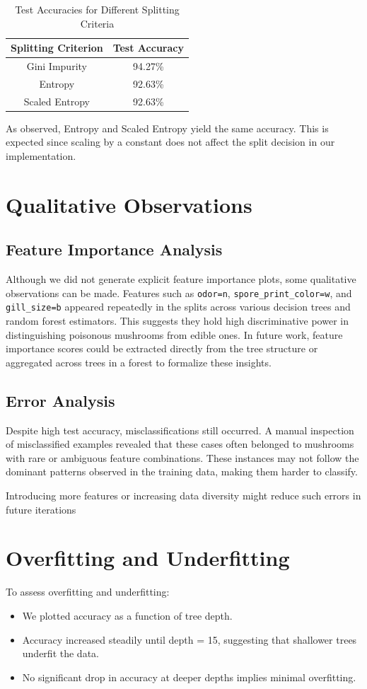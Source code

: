 \documentclass[11pt]{article}
\begin{document}
\begin{table}[H]
\centering
\begin{tabular}{|c|c|}
\hline
\textbf{Splitting Criterion} & \textbf{Test Accuracy} \\
\hline
Gini Impurity & 94.27\% \\
Entropy & 92.63\% \\
Scaled Entropy & 92.63\% \\
\hline
\end{tabular}
\caption{Test Accuracies for Different Splitting Criteria}
\end{table}

As observed, Entropy and Scaled Entropy yield the same accuracy. This is expected since scaling by a constant does not affect the split decision in our implementation.

\section{Qualitative Observations}
\subsection{Feature Importance Analysis}

Although we did not generate explicit feature importance plots, some qualitative observations can be made. Features such as \texttt{odor=n}, \texttt{spore\_print\_color=w}, and \texttt{gill\_size=b} appeared repeatedly in the splits across various decision trees and random forest estimators. This suggests they hold high discriminative power in distinguishing poisonous mushrooms from edible ones. In future work, feature importance scores could be extracted directly from the tree structure or aggregated across trees in a forest to formalize these insights.

\subsection{Error Analysis}
Despite high test accuracy, misclassifications still occurred. A manual inspection of misclassified examples revealed that these cases often belonged to mushrooms with rare or ambiguous feature combinations. These instances may not follow the dominant patterns observed in the training data, making them harder to classify.

Introducing more features or increasing data diversity might reduce such errors in future iterations

\section{Overfitting and Underfitting}
To assess overfitting and underfitting:
\begin{itemize}
    \item We plotted accuracy as a function of tree depth.
    \item Accuracy increased steadily until depth = 15, suggesting that shallower trees underfit the data.
    \item No significant drop in accuracy at deeper depths implies minimal overfitting.
\end{itemize}
\end{document}
